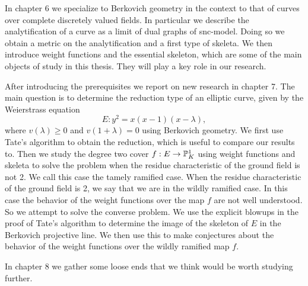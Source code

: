 In chapter 6 we specialize to Berkovich geometry in the context to that of curves over complete discretely valued fields. 
In particular we describe the analytification of a curve as a limit of dual graphs of snc-model. 
Doing so we obtain a metric on the analytification and a first type of skeleta.
We then introduce weight functions and the essential skeleton, which are some of the main objects of study in this thesis. 
They will play a key role in our research.  

\medskip


After introducing the prerequisites we report on new research in chapter 7. 
The main question is to determine the reduction type of an elliptic curve, given by the Weierstrass equation \[
	E: y^2 = x(x-1)(x-\lambda)
,\] 
where $v(\lambda) \ge 0$ and $v(1 + \lambda) = 0$ using Berkovich geometry.
We first use Tate's algorithm to obtain the reduction, which is useful to compare our results to. 
Then we study the degree two cover $f: E \to \mathbb{P}^{1}_K$ using weight functions and skeleta to solve the problem when the residue characteristic of the ground field is not 2.
We call this case the tamely ramified case. 
When the residue characteristic of the ground field is 2, we say that we are in the wildly ramified case. 
In this case the behavior of the weight functions over the map $f$ are not well understood. 
So we attempt to solve the converse problem. 
We use the explicit blowups in the proof of Tate's algorithm to determine the image of the skeleton of $E$ in the Berkovich projective line.
We then use this to make conjectures about the behavior of the weight functions over the wildly ramified map $f$. 

In chapter 8 we gather some loose ends that we think would be worth studying further. 


